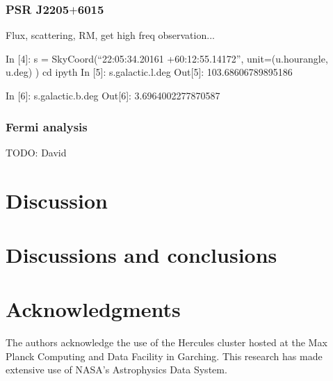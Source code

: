 \documentclass[a4paper,fleqn,usenatbib]{mnras}
\begin{document}
\subsubsection{PSR J2205$+$6015}

Flux, scattering, RM, get high freq observation...


In [4]: s = SkyCoord(``22:05:34.20161 +60:12:55.14172'', unit=(u.hourangle, u.deg) )
cd ipyth
In [5]: s.galactic.l.deg
Out[5]: 103.68606789895186

In [6]: s.galactic.b.deg
Out[6]: 3.6964002277870587

\subsubsection{Fermi analysis}

TODO: David


\section{Discussion}
\label{sec:discussion}


\section{Discussions and conclusions}
\label{sec:conclusion}


\section*{Acknowledgments}

The authors acknowledge the use of the Hercules cluster hosted at the
Max Planck Computing and Data Facility in Garching. This research has
made extensive use of NASA's Astrophysics Data System.







\appendix
%



\bsp	%
\label{lastpage}
\end{document}
